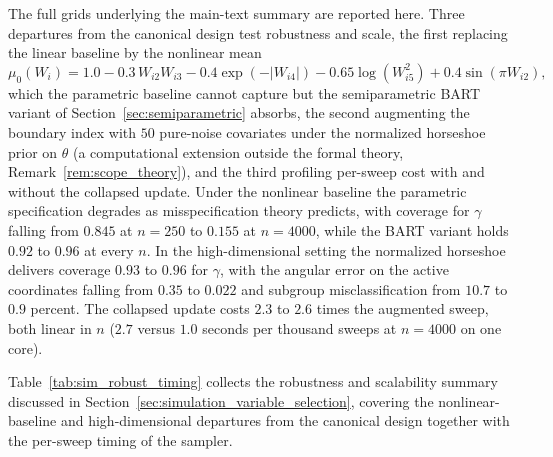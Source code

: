 \documentclass[11pt]{article}
\theoremstyle{definition}
\theoremstyle{plain}
\begin{document}
The full grids underlying the main-text summary are reported here. Three departures from the canonical design test robustness and scale, the first replacing the linear baseline by the nonlinear mean
\[
\mu_0(W_i)=1.0-0.3\,W_{i2}W_{i3}-0.4\exp(-|W_{i4}|)-0.65\log(W_{i5}^2)+0.4\sin(\pi W_{i2}),
\]
which the parametric baseline cannot capture but the semiparametric BART variant of Section~\ref{sec:semiparametric} absorbs, the second augmenting the boundary index with $50$ pure-noise covariates under the normalized horseshoe prior on $\theta$ (a computational extension outside the formal theory, Remark~\ref{rem:scope_theory}), and the third profiling per-sweep cost with and without the collapsed update. Under the nonlinear baseline the parametric specification degrades as misspecification theory predicts, with coverage for $\gamma$ falling from $0.845$ at $n=250$ to $0.155$ at $n=4000$, while the BART variant holds $0.92$ to $0.96$ at every $n$. In the high-dimensional setting the normalized horseshoe delivers coverage $0.93$ to $0.96$ for $\gamma$, with the angular error on the active coordinates falling from $0.35$ to $0.022$ and subgroup misclassification from $10.7$ to $0.9$ percent. The collapsed update costs $2.3$ to $2.6$ times the augmented sweep, both linear in $n$ ($2.7$ versus $1.0$ seconds per thousand sweeps at $n=4000$ on one core).

Table~\ref{tab:sim_robust_timing} collects the robustness and scalability summary discussed in Section~\ref{sec:simulation_variable_selection}, covering the nonlinear-baseline and high-dimensional departures from the canonical design together with the per-sweep timing of the sampler.
\end{document}
